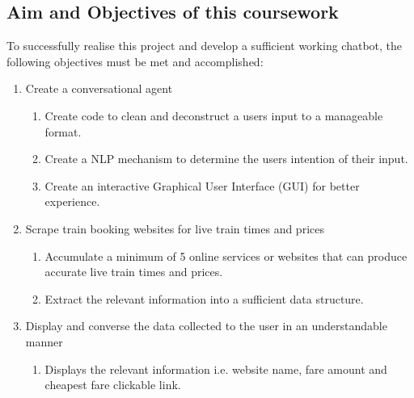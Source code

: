 
\subsection{Aim and Objectives of this coursework}\label{Sec: Aim and Objs}
To successfully realise this project and develop a sufficient working chatbot, the following objectives must be met and accomplished: 
\begin{enumerate}
    \item Create a conversational agent
        \begin{enumerate}
            \item Create code to clean and deconstruct a users input to a manageable format.
            \item Create a NLP mechanism to determine the users intention of their input.
            \item Create an interactive Graphical User Interface (GUI) for better experience.
        \end{enumerate}

    \item Scrape train booking websites for live train times and prices
        \begin{enumerate}
            \item Accumulate a minimum of 5 online services or websites that can produce accurate live train times and prices.
            \item Extract the relevant information into a sufficient data structure.
        \end{enumerate}

    \item Display and converse the data collected to the user in an understandable manner
        \begin{enumerate}
            \item Displays the relevant information i.e. website name, fare amount and cheapest fare clickable link. 
        \end{enumerate}


\end{enumerate}
